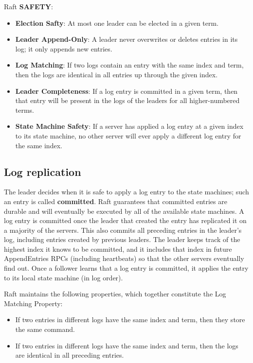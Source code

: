 \documentclass[11pt]{article}
\begin{document}
Raft \textbf{SAFETY}:
\begin{itemize}
\item \textbf{Election Safty}: At most one leader can be elected in a given term.
\item \textbf{Leader Append-Only}: A leader never overwrites or deletes entries in its log; it only appends new entries.
\item \textbf{Log Matching}: If two logs contain an entry with the same index and term, then the logs are identical
in all entries up through the given index.
\item \textbf{Leader Completeness}: If a log entry is committed in a given term, then that entry will be present in
the logs of the leaders for all higher-numbered terms.
\item \textbf{State Machine Safety}: If a server has applied a log entry at a given index to its state machine, no
other server will ever apply a different log entry for the same index.
\end{itemize}
\subsection{Log replication}
\label{sec:orga2a9e9f}
The leader decides when it is safe to apply a log entry to the state machines; such an entry is called
\textbf{committed}. Raft guarantees that committed entries are durable and will eventually be executed by all
of the available state machines. A log entry is committed once the leader that created the entry has
replicated it on a majority of the servers. This also commits all preceding entries in the leader’s
log, including entries created by previous leaders. The leader keeps track of the highest index it
knows to be committed, and it includes that index in future AppendEntries RPCs (including heartbeats)
so that the other servers eventually find out. Once a follower learns that a log entry is committed,
it applies the entry to its local state machine (in log order).

Raft maintains the following properties, which together constitute the Log Matching Property:
\begin{itemize}
\item If two entries in different logs have the same index and term, then they store the same command.
\item If two entries in different logs have the same index and term, then the logs are identical in all
preceding entries.
\end{itemize}
\end{document}
